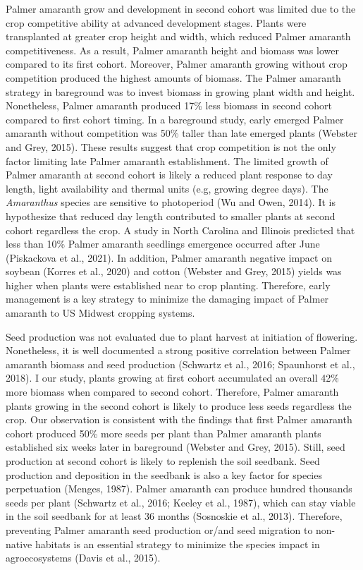 \documentclass[utf8]{frontiersSCNS}
\begin{document}
Palmer amaranth grow and development in second cohort was limited due to
the crop competitive ability at advanced development stages. Plants were
transplanted at greater crop height and width, which reduced Palmer
amaranth competitiveness. As a result, Palmer amaranth height and
biomass was lower compared to its first cohort. Moreover, Palmer
amaranth growing without crop competition produced the highest amounts
of biomass. The Palmer amaranth strategy in bareground was to invest
biomass in growing plant width and height. Nonetheless, Palmer amaranth
produced 17\% less biomass in second cohort compared to first cohort
timing. In a bareground study, early emerged Palmer amaranth without
competition was 50\% taller than late emerged plants (Webster and Grey,
2015). These results suggest that crop competition is not the only
factor limiting late Palmer amaranth establishment. The limited growth
of Palmer amaranth at second cohort is likely a reduced plant response
to day length, light availability and thermal units (e.g, growing degree
days). The \emph{Amaranthus} species are sensitive to photoperiod (Wu
and Owen, 2014). It is hypothesize that reduced day length contributed
to smaller plants at second cohort regardless the crop. A study in North
Carolina and Illinois predicted that less than 10\% Palmer amaranth
seedlings emergence occurred after June (Piskackova et al., 2021). In
addition, Palmer amaranth negative impact on soybean (Korres et al.,
2020) and cotton (Webster and Grey, 2015) yields was higher when plants
were established near to crop planting. Therefore, early management is a
key strategy to minimize the damaging impact of Palmer amaranth to US
Midwest cropping systems.

Seed production was not evaluated due to plant harvest at initiation of
flowering. Nonetheless, it is well documented a strong positive
correlation between Palmer amaranth biomass and seed production
(Schwartz et al., 2016; Spaunhorst et al., 2018). I our study, plants
growing at first cohort accumulated an overall 42\% more biomass when
compared to second cohort. Therefore, Palmer amaranth plants growing in
the second cohort is likely to produce less seeds regardless the crop.
Our observation is consistent with the findings that first Palmer
amaranth cohort produced 50\% more seeds per plant than Palmer amaranth
plants established six weeks later in bareground (Webster and Grey,
2015). Still, seed production at second cohort is likely to replenish
the soil seedbank. Seed production and deposition in the seedbank is
also a key factor for species perpetuation (Menges, 1987). Palmer
amaranth can produce hundred thousands seeds per plant (Schwartz et al.,
2016; Keeley et al., 1987), which can stay viable in the soil seedbank
for at least 36 months (Sosnoskie et al., 2013). Therefore, preventing
Palmer amaranth seed production or/and seed migration to non-native
habitats is an essential strategy to minimize the species impact in
agroecosystems (Davis et al., 2015).
\end{document}
